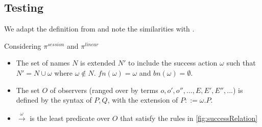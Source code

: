 




\subsection{Testing}

We adapt the definition from \citep{DBLP:journals/entcs/CacciagranoCAV08test} and note the similarities with \citep{10.1007/978-3-540-49382-2_9}. 

\begin{definition}[Observers] Considering $\pi^{session}$ and $\pi^{linear}$


    \begin{itemize}
        \item The set of names $N$ is extended $N'$ to include the success action $\omega$ such that $N' = N \cup {\omega}$ where $\omega \not \in N$. $fn(\omega) = \omega$ and $bn(\omega) = \emptyset$.
        \item The set $O$ of observers (ranged over by terms $o, o', o'',..., E, E',E'',...$) is defined by the syntax of $P, Q$, with the extension of $P::= \omega.P$.
        \item $\xrightarrow{\omega}$ is the least predicate over $O$ that satisfy the rules in \autoref{fig:successRelation}
    \end{itemize}
\end{definition}

